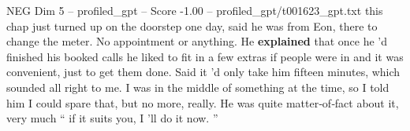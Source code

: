 \begin{textsample}{NEG Dim 5 – profiled\_gpt – Score -1.00 – profiled\_gpt/t001623\_gpt.txt}  \label{ex:f5_neg_030}
this chap just turned up on the doorstep one day, said he was from Eon, there to change the meter.
No appointment or anything.
He \textbf{explained} that once he ’d finished his booked calls he liked to fit in a few extras if people were in and it was convenient, just to get them done.
Said it ’d only take him fifteen minutes, which sounded all right to me.
I was in the middle of something at the time, so I told him I could spare that, but no more, really.
He was quite matter‑of‑fact about it, very much “ if it suits you, I ’ll do it now. ”

\end{textsample}
